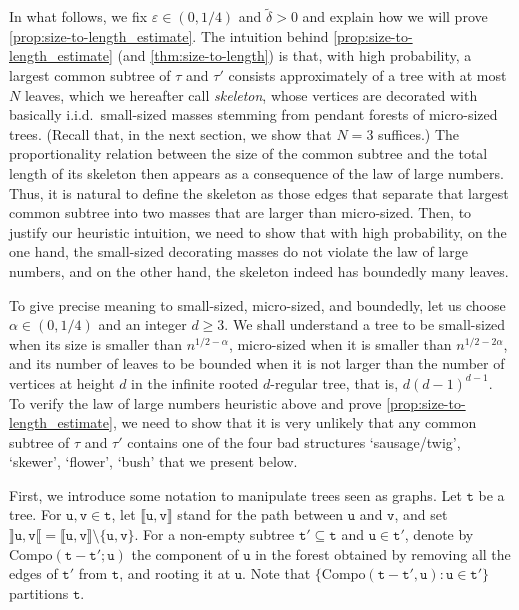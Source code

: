 \documentclass[11pt,reqno]{amsart}
\newcommand{\1}{\mathbf{1}}
\newcommand{\0}{\mathbf{0}}
\newcommand{\ttu}{\mathtt{u}}
\newcommand{\ttv}{\mathtt{v}}
\newcommand{\ttt}{\mathtt{t}}
\begin{document}
In what follows, we fix $\varepsilon\in (0,1/4)$ and $\tilde{\delta}>0$ and explain how we will prove \cref{prop:size-to-length_estimate}. The intuition behind \cref{prop:size-to-length_estimate} (and \cref{thm:size-to-length}) is that, with high probability, a largest common subtree of $\tau$ and $\tau'$ consists approximately of a tree with at most $N$ leaves, which we hereafter call \emph{skeleton}, whose vertices are decorated with basically i.i.d.~small-sized masses stemming from pendant forests of micro-sized trees. (Recall that, in the next section, we show that $N=3$ suffices.) The proportionality relation between the size of the common subtree and the total length of its skeleton then appears as a consequence of the law of large numbers. Thus, it is natural to define the skeleton as those edges that separate that largest common subtree into two masses that are larger than micro-sized. Then, to justify our heuristic intuition, we need to show that with high probability, on the one hand, the small-sized decorating masses do not violate the law of large numbers, and on the other hand, the skeleton indeed has boundedly many leaves.
\smallskip

To give precise meaning to small-sized, micro-sized, and boundedly, let us choose $\alpha\in(0,1/4)$ and an integer $d\geq 3$. We shall understand a tree to be small-sized when its size is smaller than $n^{1/2-\alpha}$, micro-sized when it is smaller than $n^{1/2-2\alpha}$, and its number of leaves to be bounded when it is not larger than the number of vertices at height $d$ in the infinite rooted $d$-regular tree, that is, $d(d-1)^{d-1}$. To verify the law of large numbers heuristic above and prove \cref{prop:size-to-length_estimate}, we need to show that it is very unlikely that any common subtree of $\tau$ and $\tau'$ contains one of the four bad structures `sausage/twig', `skewer', `flower', `bush' that we present below.
\smallskip

First, we introduce some notation to manipulate trees seen as graphs. Let $\ttt$ be a tree. For $\ttu,\ttv\in\ttt$, let $\llbracket \ttu,\ttv\rrbracket$ stand for the path between $\ttu$ and $\ttv$, and set $\rrbracket \ttu,\ttv\llbracket=\llbracket \ttu,\ttv\rrbracket\setminus\{\ttu,\ttv\}$. For a non-empty subtree $\ttt'\subseteq \ttt$ and $\ttu\in\ttt'$, denote by $\mathrm{Compo}(\ttt-\ttt';\ttu)$ the component of $\ttu$ in the forest obtained by removing all the edges of $\ttt'$ from $\ttt$, and rooting it at $\ttu$. Note that $\{ \mathrm{Compo}(\ttt-\ttt',\ttu) : \ttu\in\ttt' \}$ partitions $\ttt$.
\smallskip
\end{document}
